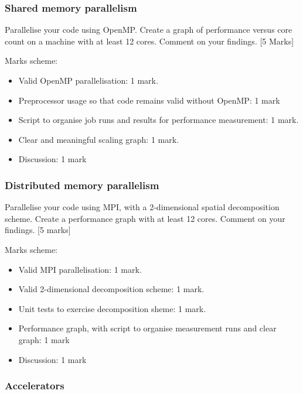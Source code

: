 \subsubsection{Shared memory
parallelism}\label{shared-memory-parallelism-2}

Parallelise your code using OpenMP. Create a graph of performance versus
core count on a machine with at least 12 cores. Comment on your
findings. {[}5 Marks{]}

Marks scheme:

\begin{itemize}
\itemsep1pt\parskip0pt
\item
  Valid OpenMP parallelisation: 1 mark.
\item
  Preprocessor usage so that code remains valid without OpenMP: 1 mark
\item
  Script to organise job runs and results for performance measurement: 1
  mark.
\item
  Clear and meaningful scaling graph: 1 mark.
\item
  Discussion: 1 mark
\end{itemize}

\subsubsection{Distributed memory
parallelism}\label{distributed-memory-parallelism-2}

Parallelise your code using MPI, with a 2-dimensional spatial
decomposition scheme. Create a performance graph with at least 12 cores.
Comment on your findings. {[}5 marks{]}

Marks scheme:

\begin{itemize}
\itemsep1pt\parskip0pt
\item
  Valid MPI parallelisation: 1 mark.
\item
  Valid 2-dimensional decomposition scheme: 1 mark.
\item
  Unit tests to exercise decomposition sheme: 1 mark.
\item
  Performance graph, with script to organise measurement runs and clear
  graph: 1 mark
\item
  Discussion: 1 mark
\end{itemize}

\subsubsection{Accelerators}\label{accelerators-1}

